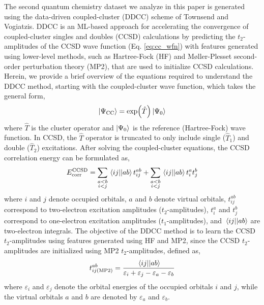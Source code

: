 \documentclass[journal=jacsat,manuscript=article]{achemso}
\begin{document}
The second quantum chemistry dataset we analyze in this paper is generated using the data-driven coupled-cluster (DDCC) scheme of Townsend and Vogiatzis.\cite{townsend_data-driven_2019}
DDCC is an ML-based approach for accelerating the convergence of coupled-cluster singles and doubles (CCSD) calculations by predicting the $t_{2}$-amplitudes of the CCSD wave function (Eq. \ref{eq:cc_wfn}) with features generated using lower-level methods, such as Hartree-Fock (HF) and M{\o}ller-Plesset second-order perturbation theory (MP2), that are used to initialize CCSD calculations.
Herein, we provide a brief overview of the equations required to understand the DDCC method, starting with the coupled-cluster wave function, which takes the general form,
\begin{equation}
	\ket{\Psi_{\text{CC}}} = \exp(\hat{T}) \ket{\Psi_{0}}
	\label{eq:cc_wfn}
\end{equation}
where $\hat{T}$ is the cluster operator and $\ket{\Psi_{0}}$ is the reference (Hartree-Fock) wave function.
In CCSD, the $\hat{T}$ operator is truncated to only include single ($\hat{T}_{1}$) and double ($\hat{T}_{2}$) excitations.
After solving the coupled-cluster equations, the CCSD correlation energy can be formulated as,
\begin{equation}
	E^{\text{CCSD}}_{\text{corr}} = \sum_{\substack{a<b \\ i<j}} \mel{ij}{}{ab} t^{ab}_{ij} + \sum_{\substack{a<b \\ i<j}} \mel{ij}{}{ab} t^{a}_{i} t^{b}_{j}
	\label{eq:cc_corr}
\end{equation}
where $i$ and $j$ denote occupied orbitals, $a$ and $b$ denote virtual orbitals, $t^{ab}_{ij}$ correspond to two-electron excitation amplitudes ($t_{2}$-amplitudes), $t^{a}_{i}$ and $t^{b}_{j}$ correspond to one-electron excitation amplitudes ($t_{1}$-amplitudes), and $\mel{ij}{}{ab}$ are two-electron integrals.
The objective of the DDCC method is to learn the CCSD $t_{2}$-amplitudes using features generated using HF and MP2, since the CCSD $t_{2}$-amplitudes are initialized using MP2 $t_{2}$-amplitudes, defined as,
\begin{equation}
	t^{ab}_{ij(\text{MP2})} = \frac{\mel{ij}{}{ab}}{\varepsilon_{i}+\varepsilon_{j}-\varepsilon_{a}-\varepsilon_{b}}
	\label{eq:MP2_t2}
\end{equation}
where $\varepsilon_{i}$ and $\varepsilon_{j}$ denote the orbital energies of the occupied orbitals $i$ and $j$, while the virtual orbitals $a$ and $b$ are denoted by $\varepsilon_{a}$ and $\varepsilon_{b}$.
\end{document}
